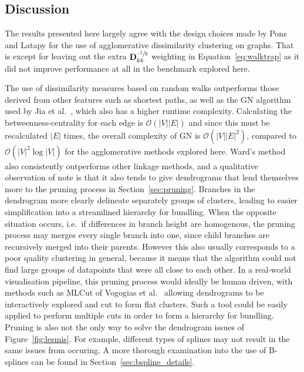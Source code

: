 \subsection{Discussion}
\label{sec:heb_discussion}
The results presented here largely agree with the design choices made by Pons and Latapy \cite{Pons2006} for the use of agglomerative dissimilarity clustering on graphs. That is except for leaving out the extra $\mathbf{D}_{kk}^{\text{--}\sfrac{1}{2}}$ weighting in Equation~\ref{eq:walktrap} as it did not improve performance at all in the benchmark explored here.

The use of dissimilarity measures based on random walks outperforms those derived from other features such as shortest paths, as well as the GN algorithm used by Jia et al.\ \cite{Jia2011}, which also has a higher runtime complexity.
Calculating the betweenness-centrality for each edge is $\mathcal{O}(|V||E|)$ \cite{Brandes2001Centrality} and since this must be recalculated $|E|$ times, the overall complexity of GN is $\mathcal{O}(|V||E|^2)$, compared to $\mathcal{O}(|V|^2\log|V|)$ for the agglomerative methods explored here.
Ward's method also consistently outperforms other linkage methods, and a qualitative observation of note is that it also tends to give dendrograms that lend themselves more to the pruning process in Section~\ref{sec:pruning}. Branches in the dendrogram more clearly delineate separately groups of clusters, leading to easier simplification into a streamlined hierarchy for bundling.
When the opposite situation occurs, i.e.\ if differences in branch height are homogenous, the pruning process may merges every single branch into one, since child branches are recursively merged into their parents. However this also usually corresponds to a poor quality clustering in general, because it means that the algorithm could not find large groups of datapoints that were all close to each other.
In a real-world visualisation pipeline, this pruning process would ideally be human driven, with methods such as MLCut of Vogogias et al.\ \cite{Vogogias2016} allowing dendrograms to be interactively explored and cut to form flat clusters. Such a tool could be easily applied to perform multiple cuts in order to form a hierarchy for bundling.
Pruning is also not the only way to solve the dendrogram issues of Figure~\ref{fig:lesmis}. For example, different types of splines may not result in the same issues from occuring.
A more thorough examination into the use of B-splines can be found in Section~\ref{sec:bspline_details}.

